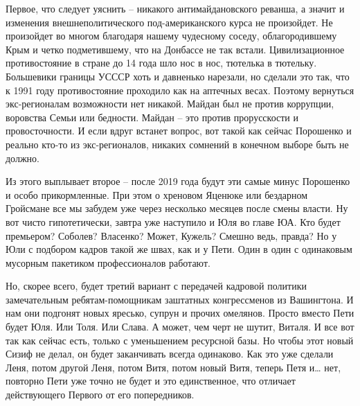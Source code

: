 Первое, что следует уяснить – никакого антимайдановского реванша, а значит и
изменения внешнеполитического под-американского курса не произойдет. Не
произойдет во многом благодаря нашему чудесному соседу, облагородившему Крым и
четко подметившему, что на Донбассе не так встали. Цивилизационное
противостояние в стране до 14 года шло нос в нос, тютелька в тютельку.
Большевики границы УСССР хоть и давненько нарезали, но сделали это так, что к
1991 году противостояние проходило как на аптечных весах. Поэтому вернуться
экс-регионалам возможности нет никакой. Майдан был не против коррупции,
воровства Семьи или бедности. Майдан – это против прорусскости и
провосточности. И если вдруг встанет вопрос, вот такой как сейчас Порошенко и
реально кто-то из экс-регионалов, никаких сомнений в конечном выборе быть не
должно.

Из этого выплывает второе – после 2019 года будут эти самые минус Порошенко и
особо прикормленные. При этом о хреновом Яценюке или бездарном Гройсмане все мы
забудем уже через несколько месяцев после смены власти. Ну вот чисто
гипотетически, завтра уже наступило и Юля во главе ЮА. Кто будет премьером?
Соболев? Власенко? Может, Кужель? Смешно ведь, правда? Но у Юли с подбором
кадров такой же швах, как и у Пети. Один в один с одинаковым мусорным пакетиком
профессионалов работают.

Но, скорее всего, будет третий вариант с передачей кадровой политики
замечательным ребятам-помощникам заштатных конгрессменов из Вашингтона. И нам
они подгонят новых яресько, супрун и прочих омелянов. Просто вместо Пети будет
Юля. Или Толя. Или Слава. А может, чем черт не шутит, Виталя. И все вот так как
сейчас есть, только с уменьшением ресурсной базы. Но чтобы этот новый Сизиф не
делал, он будет заканчивать всегда одинаково. Как это уже сделали Леня, потом
другой Леня, потом Витя, потом новый Витя, теперь Петя и… нет, повторно Пети
уже точно не будет и это единственное, что отличает действующего Первого от его
попередников.

